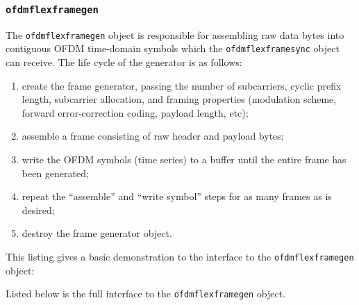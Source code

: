 \subsubsection{{\tt ofdmflexframegen}}
\label{module:framing:ofdmflexframe:gen}
%
The {\tt ofdmflexframegen} object is responsible for assembling raw data
bytes into contiguous OFDM time-domain symbols which the
{\tt ofdmflexframesync} object can receive.
The life cycle of the generator is as follows:
%
\begin{enumerate}
\item create the frame generator, passing the number of subcarriers,
      cyclic prefix length, subcarrier allocation, and framing
      properties (modulation scheme, forward error-correction
      coding, payload length, etc);
\item assemble a frame consisting of raw header and payload bytes;
\item write the OFDM symbols (time series) to a buffer until the entire
      frame has been generated;
\item repeat the ``assemble'' and ``write symbol'' steps for as many
      frames as is desired;
\item destroy the frame generator object.
\end{enumerate}
%
This listing gives a basic demonstration to the interface to the
{\tt ofdmflexframegen} object:
%

%
Listed below is the full interface to the {\tt ofdmflexframegen}
object.
%
%
